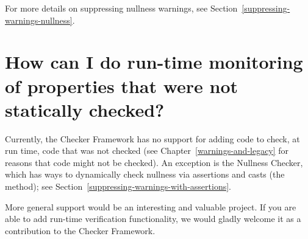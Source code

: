 For more details on suppressing nullness warnings, see
Section~\ref{suppressing-warnings-nullness}.


\section{How can I do run-time monitoring of properties that were not statically checked?\label{faq-run-time-checking}}

Currently, the Checker Framework has no support for adding code to check,
at run time, code that was not checked (see
Chapter~\ref{warnings-and-legacy} for reasons that code might not be
checked).  An exception is the Nullness Checker, which has ways to
dynamically check nullness via assertions and casts (the
 method); see
Section~\ref{suppressing-warnings-with-assertions}.

More general support would be an interesting and valuable project.  If you
are able to add run-time verification functionality, we would gladly
welcome it as a contribution to the Checker Framework.


